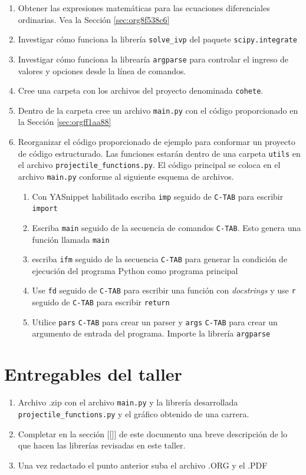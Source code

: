 \documentclass{article}
\begin{document}
\begin{enumerate}
\item Obtener las expresiones matemáticas para las ecuaciones
diferenciales ordinarias. Vea la Sección \ref{sec:org8f538c6}
\item Investigar cómo funciona la librería \texttt{solve\_ivp} del paquete
\texttt{scipy.integrate}
\item Investigar cómo funciona la librearía \texttt{argparse} para controlar el
ingreso de valores y opciones desde la línea de comandos.
\item Cree una carpeta con los archivos del proyecto denominada \texttt{cohete}.
\item Dentro de la carpeta cree un archivo \texttt{main.py} con el código
proporcionado en la Sección \ref{sec:orgff1aa88}
\item Reorganizar el código proporcionado de ejemplo para conformar un
proyecto de código estructurado. Las funciones estarán dentro de
una carpeta \texttt{utils} en el archivo \texttt{projectile\_functions.py}. El
código principal se coloca en el archivo \texttt{main.py} conforme al
siguiente esquema de archivos.
\begin{enumerate}
\item Con YASnippet habilitado escriba \texttt{imp} seguido de \texttt{C-TAB} para
escribir \texttt{import}
\item Escriba \texttt{main} seguido de la secuencia
de comandos \texttt{C-TAB}. Esto genera una función llamada \texttt{main}
\item escriba \texttt{ifm} seguido de la secuencia \texttt{C-TAB} para generar la
condición de ejecución del programa Python como programa
principal
\item Use \texttt{fd} seguido de \texttt{C-TAB} para escribir una función con
\emph{docstrings} y use \texttt{r} seguido de \texttt{C-TAB} para escribir \texttt{return}
\item Utilice \texttt{pars} \texttt{C-TAB} para crear un parser y \texttt{args} \texttt{C-TAB}
para crear un argumento de entrada del programa. Importe la
librería \texttt{argparse}
\end{enumerate}
\end{enumerate}

\section{Entregables del taller}
\label{sec:org9568a2f}
\begin{enumerate}
\item Archivo .zip con el archivo \texttt{main.py} y la librería desarrollada
\texttt{projectile\_functions.py} y el gráfico obtenido de una carrera.
\item Completar en la sección [[]] de este documento una breve
descripción de lo que hacen las librerías revisadas en este taller.
\item Una vez redactado el punto anterior suba el archivo .ORG y el .PDF
\end{enumerate}
\end{document}
